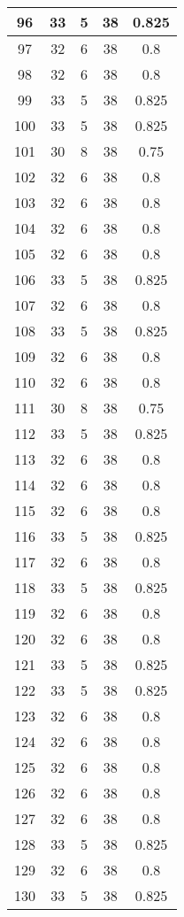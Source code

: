 \documentclass[letterpaper, 12pt]{article}
\begin{document}
\begin{longtable}{|c|c|c|c|c|}
\hline
96 & 33 & 5 & 38 & 0.825 \\
\hline
97 & 32 & 6 & 38 & 0.8 \\
\hline
98 & 32 & 6 & 38 & 0.8 \\
\hline
99 & 33 & 5 & 38 & 0.825 \\
\hline
100 & 33 & 5 & 38 & 0.825 \\
\hline
101 & 30 & 8 & 38 & 0.75 \\
\hline
102 & 32 & 6 & 38 & 0.8 \\
\hline
103 & 32 & 6 & 38 & 0.8 \\
\hline
104 & 32 & 6 & 38 & 0.8 \\
\hline
105 & 32 & 6 & 38 & 0.8 \\
\hline
106 & 33 & 5 & 38 & 0.825 \\
\hline
107 & 32 & 6 & 38 & 0.8 \\
\hline
108 & 33 & 5 & 38 & 0.825 \\
\hline
109 & 32 & 6 & 38 & 0.8 \\
\hline
110 & 32 & 6 & 38 & 0.8 \\
\hline
111 & 30 & 8 & 38 & 0.75 \\
\hline
112 & 33 & 5 & 38 & 0.825 \\
\hline
113 & 32 & 6 & 38 & 0.8 \\
\hline
114 & 32 & 6 & 38 & 0.8 \\
\hline
115 & 32 & 6 & 38 & 0.8 \\
\hline
116 & 33 & 5 & 38 & 0.825 \\
\hline
117 & 32 & 6 & 38 & 0.8 \\
\hline
118 & 33 & 5 & 38 & 0.825 \\
\hline
119 & 32 & 6 & 38 & 0.8 \\
\hline
120 & 32 & 6 & 38 & 0.8 \\
\hline
121 & 33 & 5 & 38 & 0.825 \\
\hline
122 & 33 & 5 & 38 & 0.825 \\
\hline
123 & 32 & 6 & 38 & 0.8 \\
\hline
124 & 32 & 6 & 38 & 0.8 \\
\hline
125 & 32 & 6 & 38 & 0.8 \\
\hline
126 & 32 & 6 & 38 & 0.8 \\
\hline
127 & 32 & 6 & 38 & 0.8 \\
\hline
128 & 33 & 5 & 38 & 0.825 \\
\hline
129 & 32 & 6 & 38 & 0.8 \\
\hline
130 & 33 & 5 & 38 & 0.825 \\

\end{longtable}
\end{document}
